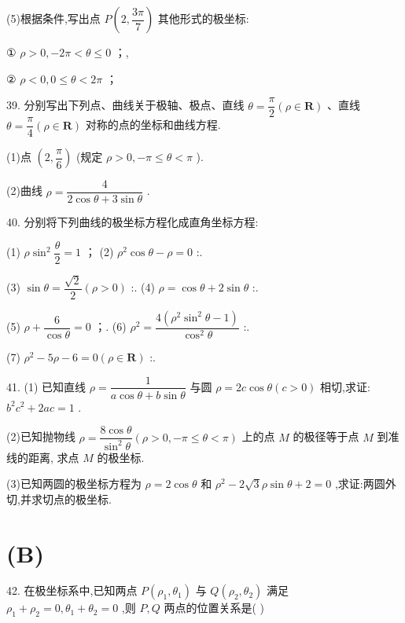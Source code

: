 (5)根据条件,写出点 $P\left( {2,\dfrac{3\pi }{7}}\right)$ 其他形式的极坐标:

① $\rho  > 0, - {2\pi } < \theta  \leq  0$ ；\blkda{},

② $\rho  < 0,0 \leq  \theta  < {2\pi }$ ；

39. 分别写出下列点、曲线关于极轴、极点、直线 $\theta  = \dfrac{\pi }{2}\left( {\rho  \in  \mathbf{R}}\right)$ 、直线 $\theta  = \dfrac{\pi }{4}\left( {\rho  \in  \mathbf{R}}\right)$ 对称的点的坐标和曲线方程.

(1)点 $\left( {2,\dfrac{\pi }{6}}\right)$ (规定 $\rho  > 0, - \pi  \leq  \theta  < \pi$ ).

(2)曲线 $\rho  = \dfrac{4}{2\cos \theta  + 3\sin \theta }$ .

40. 分别将下列曲线的极坐标方程化成直角坐标方程:

(1) $\rho {\sin }^{2}\dfrac{\theta }{2} = 1$ ；\blkda{} (2) ${\rho }^{2}\cos \theta  - \rho  = 0$ :\blkda{}.

(3) $\sin \theta  = \dfrac{\sqrt{2}}{2}\left( {\rho  > 0}\right)$ :\blkda{}. (4) $\rho  = \cos \theta  + 2\sin \theta$ :\blkda{}.

(5) $\rho  + \dfrac{6}{\cos \theta } = 0$ ；\blkda{}. (6) ${\rho }^{2} = \dfrac{4\left( {{\rho }^{2}{\sin }^{2}\theta  - 1}\right) }{{\cos }^{2}\theta }$ :\blkda{}.

(7) ${\rho }^{2} - {5\rho } - 6 = 0\left( {\rho  \in  \mathbf{R}}\right)$ :\blkda{}.

41. (1) 已知直线 $\rho  = \dfrac{1}{a\cos \theta  + b\sin \theta }$ 与圆 $\rho  = {2c}\cos \theta \left( {c > 0}\right)$ 相切,求证: ${b}^{2}{c}^{2} + {2ac} = 1$ .

(2)已知抛物线 $\rho  = \dfrac{8\cos \theta }{{\sin }^{2}\theta }\left( {\rho  > 0, - \pi  \leq  \theta  < \pi }\right)$ 上的点 $M$ 的极径等于点 $M$ 到准线的距离, 求点 $M$ 的极坐标.

(3)已知两圆的极坐标方程为 $\rho  = 2\cos \theta$ 和 ${\rho }^{2} - 2\sqrt{3}\rho \sin \theta  + 2 = 0$ ,求证:两圆外切,并求切点的极坐标.

\section*{(B)}

42. 在极坐标系中,已知两点 $P\left( {{\rho }_{1},{\theta }_{1}}\right)$ 与 $Q\left( {{\rho }_{2},{\theta }_{2}}\right)$ 满足 ${\rho }_{1} + {\rho }_{2} = 0,{\theta }_{1} + {\theta }_{2} = 0$ ,则 $P,Q$ 两点的位置关系是(   )

